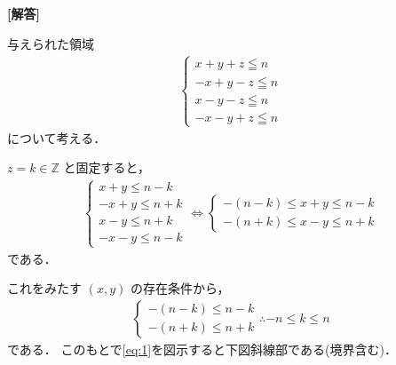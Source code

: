 \documentclass[../../main.tex]{subfiles}
\begin{document}
\begin{oframed}
  
\end{oframed}

{\bf [解答]}

与えられた領域
\begin{align}
  \begin{cases}
    x+y+z \leqq n \\
    -x+y-z \leqq n \\
    x-y-z \leqq n \\
    -x-y+z \leqq n
  \end{cases}
\end{align}
について考える．

$z = k \in \mathbb{Z}$ と固定すると，
\begin{align}
  \begin{cases}
    x + y \le n - k \\
    -x + y \le n + k \\
    x - y \le n + k \\
    -x - y \le n - k
  \end{cases}
  \iff
  \begin{cases}
    -(n-k) \le x + y \le n - k \\
    -(n+k) \le x - y \le n + k
  \end{cases} \label{eq:1}
\end{align}
である．

これをみたす $(x, y)$ の存在条件から，
\begin{align}
  \begin{cases}
    -(n-k) \le n - k \\
    -(n+k) \le n + k
  \end{cases}
  \therefore
  -n \le k \le n \label{eq:2}
\end{align}
である．
このもとで\cref{eq:1}を図示すると下図斜線部である(境界含む)．
\end{document}
